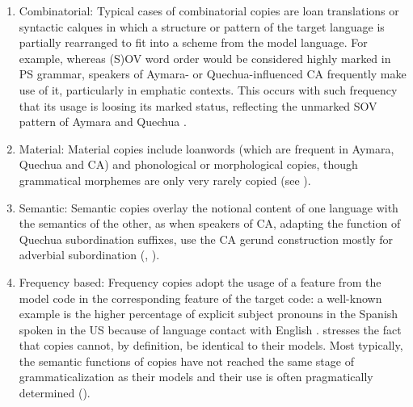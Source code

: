\documentclass[output=paper,hidelinks]{langscibook}
\begin{document}
\begin{enumerate}
    \item Combinatorial: Typical cases of combinatorial copies are loan translations or syntactic calques in which a structure or pattern of the target language is partially rearranged to fit into a scheme from the model language. For example, whereas (S)OV word order would be considered highly marked in PS grammar, speakers of Aymara- or Quechua-influenced CA frequently make use of it, particularly in emphatic contexts. This occurs with such frequency that its usage is loosing its marked status, reflecting the unmarked SOV pattern of Aymara and Quechua \citep[102--108]{pfander2009gramatica}.
    \item Material: Material copies include loanwords (which are frequent in Aymara, Quechua and CA) and phonological or morphological copies, though grammatical morphemes are only very rarely copied (see \citealt[242]{pfander2009gramatica}).
    \item Semantic: Semantic copies overlay the notional content of one language with the semantics of the other, as when speakers of CA, adapting the function of Quechua subordination suffixes, use the CA gerund construction mostly for adverbial subordination (\cite[139--147]{pfander2009gramatica}, \citealt{RN53}).
    \item Frequency based: Frequency copies adopt the usage of a feature from the model code in the corresponding feature of the target code: a well-known example is the higher percentage of explicit subject pronouns in the Spanish spoken in the US because of language contact with English \citep{RN58}. \citet[62]{RN59} stresses the fact that copies cannot, by definition, be identical to their models. Most typically, the semantic functions of copies have not reached the same stage of grammaticalization as their models and their use is often pragmatically determined (\citeyear[70]{RN59}).
\end{enumerate}
\end{document}
